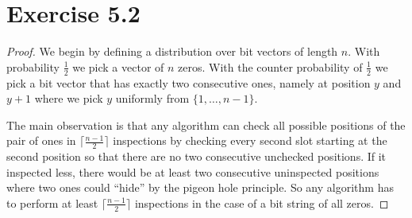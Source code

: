 \documentclass[10pt,a4paper]{article}
\begin{document}
\section*{Exercise 5.2}

\begin{proof}
  We begin by defining a distribution over bit vectors of length $n$.
  With probability $\frac{1}{2}$ we pick a vector of $n$ zeros.
  With the counter probability of $\frac{1}{2}$ we pick a bit vector that has exactly two consecutive ones, namely at position $y$ and $y + 1$ where we pick $y$ uniformly from $\{ 1, \dots, n - 1 \}$.

  The main observation is that any algorithm can check all possible positions of the pair of ones in $\lceil \frac{n - 1}{2} \rceil$ inspections by checking every second slot starting at the second position so that there are no two consecutive unchecked positions.
  If it inspected less, there would be at least two consecutive uninspected positions where two ones could ``hide'' by the pigeon hole principle.
  So any algorithm has to perform at least $\lceil \frac{n - 1}{2} \rceil$ inspections in the case of a bit string of all zeros.


\end{proof}
\end{document}
